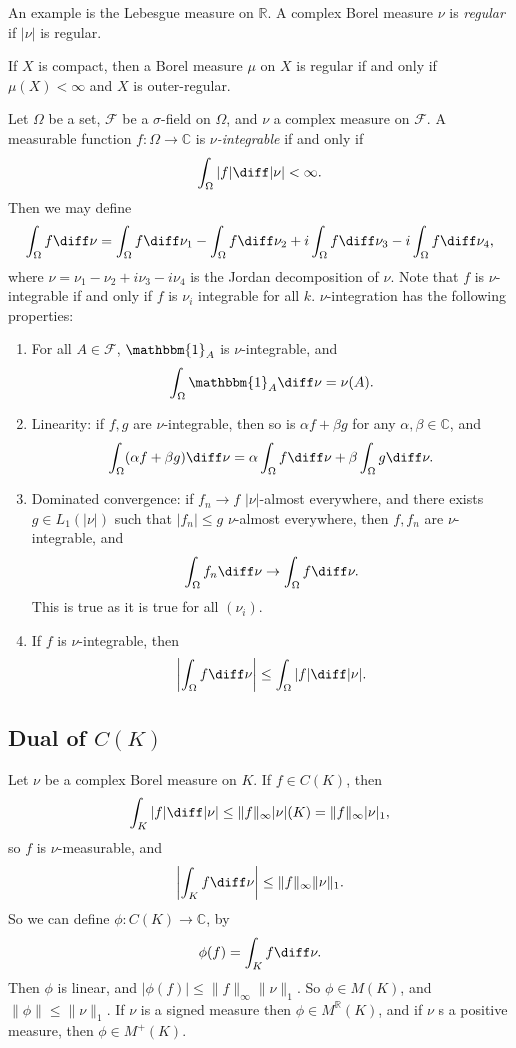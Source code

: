 \documentclass[12pt]{article}
\begin{document}
An example is the Lebesgue measure on $\mathbb{R}$. A complex Borel measure $\nu$ is \emph{regular} if $|\nu|$ is regular.

If $X$ is compact, then a Borel measure $\mu$ on $X$ is regular if and only if $\mu(X) < \infty$ and $X$ is outer-regular.

Let $\Omega$ be a set, $\mathcal{F}$ be a $\sigma$-field on $\Omega$, and $\nu$ a complex measure on $\mathcal{F}$. A measurable function $f : \Omega \to \mathbb{C}$ is \emph{$\nu$-integrable} if and only if
\[
\int_{\Omega} |f| \diff |\nu| < \infty.
\]
Then we may define
\[
\int_{\Omega} f \diff \nu = \int_{\Omega} f \diff \nu_1 - \int_{\Omega} f \diff \nu_2 + i \int_{\Omega} f \diff \nu_3 - i \int_{\Omega} f \diff \nu_4,
\]
where $\nu = \nu_1 - \nu_2 + i \nu_3 - i \nu_4$ is the Jordan decomposition of $\nu$. Note that $f$ is $\nu$-integrable if and only if $f$ is $\nu_i$ integrable for all $k$. $\nu$-integration has the following properties:
\begin{enumerate}
	\item For all $A \in \mathcal{F}$, $\mathbbm{1}_{A}$ is $\nu$-integrable, and
		\[
		\int_{\Omega} \mathbbm{1}_{A} \diff \nu = \nu(A).
		\]
	\item Linearity: if $f, g$ are $\nu$-integrable, then so is $\alpha f + \beta g$ for any $\alpha, \beta \in \mathbb{C}$, and
		\[
		\int_{\Omega}(\alpha f + \beta g) \diff \nu = \alpha \int_{\Omega} f \diff \nu + \beta \int_{\Omega} g \diff \nu.
		\]
	\item Dominated convergence: if $f_n \to f$ $|\nu|$-almost everywhere, and there exists $g \in L_1(|\nu|)$ such that $|f_n| \leq g$ $\nu$-almost everywhere, then $f, f_n$ are $\nu$-integrable, and
		\[
		\int_{\Omega} f_n \diff \nu \to \int_{\Omega}f \diff \nu.
		\]
		This is true as it is true for all $(\nu_i)$.
	\item If $f$ is $\nu$-integrable, then
		\[
		\left| \int_{\Omega} f \diff \nu \right| \leq \int_{\Omega} |f| \diff |\nu|.
		\]
\end{enumerate}

\subsection{Dual of \texorpdfstring{$C(K)$}{C(K)}}%
\label{sub:dual_ck}

Let $\nu$ be a complex Borel measure on $K$. If $f \in C(K)$, then
\[
\int_{K} |f| \diff |\nu| \leq \|f\|_\infty |\nu| (K) = \|f\|_\infty |\nu|_1,
\]
so $f$ is $\nu$-measurable, and
\[
\left| \int_K f \diff \nu \right| \leq \|f\|_\infty \|\nu\|_1.
\]
So we can define $\phi : C(K) \to \mathbb{C}$, by
\[
\phi(f) = \int_K f \diff \nu.
\]
Then $\phi$ is linear, and $|\phi(f)| \leq \|f\|_\infty \|\nu\|_1$. So $\phi \in M(K)$, and $\|\phi\| \leq \|\nu\|_1$. If $\nu$ is a signed measure then $\phi \in M^{\mathbb{R}}(K)$, and if $\nu$ 	s a positive measure, then $\phi \in M^{+}(K)$.
\end{document}
